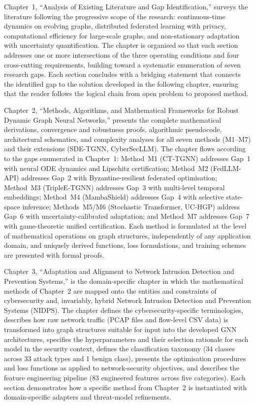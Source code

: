 Chapter~1, ``Analysis of Existing Literature and Gap Identification,'' surveys the literature following the progressive scope of the research: continuous-time dynamics on evolving graphs, distributed federated learning with privacy, computational efficiency for large-scale graphs, and non-stationary adaptation with uncertainty quantification. The chapter is organised so that each section addresses one or more intersections of the three operating conditions and four cross-cutting requirements, building toward a systematic enumeration of seven research gaps. Each section concludes with a bridging statement that connects the identified gap to the solution developed in the following chapter, ensuring that the reader follows the logical chain from open problem to proposed method.

Chapter~2, ``Methods, Algorithms, and Mathematical Frameworks for Robust Dynamic Graph Neural Networks,'' presents the complete mathematical derivations, convergence and robustness proofs, algorithmic pseudocode, architectural schematics, and complexity analyses for all seven methods (M1--M7) and their extensions (SDE-TGNN, CyberSecLLM). The chapter flows according to the gaps enumerated in Chapter~1: Method~M1 (CT-TGNN) addresses Gap~1 with neural ODE dynamics and Lipschitz certification; Method~M2 (FedLLM-API) addresses Gap~2 with Byzantine-resilient federated optimisation; Method~M3 (TripleE-TGNN) addresses Gap~3 with multi-level temporal embeddings; Method~M4 (MambaShield) addresses Gap~4 with selective state-space inference; Methods~M5/M6 (Stochastic Transformer, UC-HGP) address Gap~6 with uncertainty-calibrated adaptation; and Method~M7 addresses Gap~7 with game-theoretic unified certification. Each method is formulated at the level of mathematical operations on graph structures, independently of any application domain, and uniquely derived functions, loss formulations, and training schemes are presented with formal proofs.

Chapter~3, ``Adaptation and Alignment to Network Intrusion Detection and Prevention Systems,'' is the domain-specific chapter in which the mathematical methods of Chapter~2 are mapped onto the entities and constraints of cybersecurity and, invariably, hybrid Network Intrusion Detection and Prevention Systems (NIDPS). The chapter defines the cybersecurity-specific terminologies, describes how raw network traffic (PCAP files and flow-level CSV data) is transformed into graph structures suitable for input into the developed GNN architectures, specifies the hyperparameters and their selection rationale for each model in the security context, defines the classification taxonomy (34 classes across 33 attack types and 1 benign class), presents the optimisation procedures and loss functions as applied to network-security objectives, and describes the feature engineering pipeline (83 engineered features across five categories). Each section demonstrates how a specific method from Chapter~2 is instantiated with domain-specific adapters and threat-model refinements.

